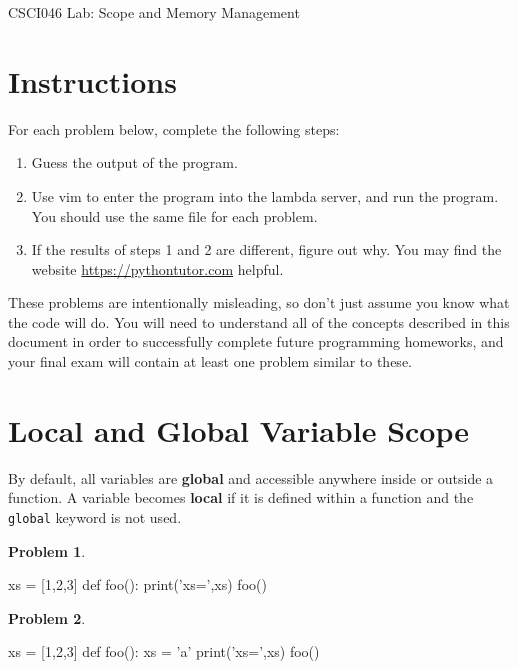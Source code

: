 \documentclass[12pt]{article}
\theoremstyle{definition}
\newtheorem{problem}{Problem}
\begin{document}
\begin{center}
    {
\Large
CSCI046 Lab: Scope and Memory Management
}
\end{center}

%

\section{Instructions}
\noindent
For each problem below, complete the following steps:
\begin{enumerate}
    \item
        Guess the output of the program.
    \item
        Use vim to enter the program into the lambda server, and run the program.
        You should use the same file for each problem.
    \item
        If the results of steps 1 and 2 are different, figure out why.
        You may find the website \url{https://pythontutor.com} helpful.
\end{enumerate}
These problems are intentionally misleading,
so don't just assume you know what the code will do.
You will need to understand all of the concepts described in this document in order to successfully complete future programming homeworks, and your final exam will contain at least one problem similar to these.

\section{Local and Global Variable Scope}
\noindent
By default, all variables are \textbf{global} and accessible anywhere inside or outside a function.
A variable becomes \textbf{local} if it is defined within a function and the \texttt{global} keyword is not used.

\begin{problem}
    ~
\begin{python}
xs = [1,2,3]
def foo():
    print('xs=',xs)
foo()
\end{python}
\end{problem}
\vspace{0.85in}

\begin{problem}
~~~
\begin{python}
xs = [1,2,3]
def foo():
    xs = 'a'
    print('xs=',xs)
foo()
\end{python}
\end{problem}
\vspace{1in}
\end{document}
